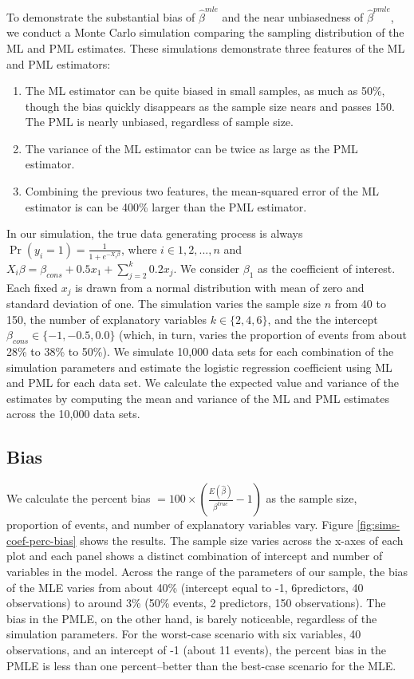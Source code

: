 \documentclass[12pt]{article}
\begin{document}
To demonstrate the substantial bias of $\hat{\beta}^{mle}$ and the near unbiasedness of $\hat{\beta}^{pmle}$, we conduct a Monte Carlo simulation comparing the sampling distribution of the ML and PML estimates.
These simulations demonstrate three features of the ML and PML estimators:
\begin{enumerate}
\item The ML estimator can be quite biased in small samples, as much as 50\%, though the bias quickly disappears as the sample size nears and passes 150. The PML is nearly unbiased, regardless of sample size.
\item The variance of the ML estimator can be twice as large as the PML estimator.
\item Combining the previous two features, the mean-squared error of the ML estimator is can be 400\% larger than the PML estimator.
\end{enumerate}
In our simulation, the true data generating process is always $\Pr(y_i = 1) = \frac{1}{1 + e^{-X_i \beta}}$, where $i \in 1, 2,..., n$ and $X_i \beta = \beta_{cons} + 0.5 x_1 + \sum_{j = 2}^k 0.2 x_j$. 
We consider $\beta_1$ as the coefficient of interest.
Each fixed $x_j$ is drawn from a normal distribution with mean of zero and standard deviation of one. 
The simulation varies the sample size $n$ from 40 to 150, the number of explanatory variables $k \in \{2, 4, 6\}$, and the the intercept $\beta_{cons} \in \{-1, -0.5, 0.0\}$ (which, in turn, varies the proportion of events from about 28\% to 38\% to 50\%). 
We simulate 10,000 data sets for each combination of the simulation parameters and estimate the logistic regression coefficient using ML and PML for each data set.
We calculate the expected value and variance of the estimates by computing the mean and variance of the ML and PML estimates across the 10,000 data sets.

\subsection*{Bias}

We calculate the percent bias $= 100 \times \left(\frac{E(\hat{\beta})}{\beta^{true}} - 1 \right)$ as the sample size, proportion of events, and number of explanatory variables vary.  Figure \ref{fig:sims-coef-perc-bias} shows the results. The sample size varies across the x-axes of each plot and each panel shows a distinct combination of intercept and number of variables in the model. Across the range of the parameters of our sample, the bias of the MLE varies from about 40\% (intercept equal to -1, 6predictors, 40 observations) to around 3\% (50\% events, 2 predictors, 150 observations). The bias in the PMLE, on the other hand, is barely noticeable, regardless of the simulation parameters. For the worst-case scenario with six variables, 40 observations, and an intercept of -1 (about 11 events), the percent bias in the PMLE is less than one percent--better than the best-case scenario for the MLE.
\end{document}
